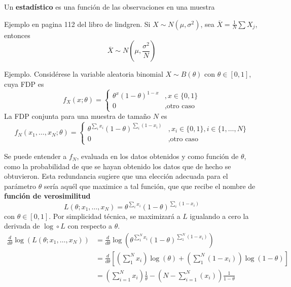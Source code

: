
\begin{definicion}
Un \textbf{estadístico} es una función de las observaciones en una muestra
\end{definicion}

Ejemplo en pagina 112 del libro de lindgren.
Si $X\sim N(\mu,\sigma^{2})$, sea $\overline{X} = \frac{1}{N} \sum X_j$, entonces
\begin{equation}
\overline{X} \sim N(\mu,\frac{\sigma^{2}}{N})
\end{equation}

Ejemplo.
Considérese la variable aleatoria binomial $X \sim B(\theta)$ con $\theta \in [0, 1]$, cuya FDP es
\begin{equation}
f_X(x; \theta) = \begin{cases}
\theta^{x} (1-\theta)^{1-x} &, x\in \{ 0,1 \} \\
0 &, \text{otro caso}
\end{cases}
\end{equation}
La FDP conjunta para una muestra de tamaño $N$ es
\begin{equation}
f_N(x_1, \dots, x_N; \theta) = 
\begin{cases}
\theta^{\sum_i x_i}(1-\theta)^{\sum_i(1-x_i)} &, x_i \in \{ 0,1 \}, i\in \{1, \dots, N\} \\
0 &, \text{otro caso}
\end{cases}
\end{equation}

Se puede entender a $f_N$, evaluada en los datos obtenidos y como función de $\theta$, como la probabilidad de que se hayan obtenido los datos que de hecho se obtuvieron.
%
Esta redundancia sugiere que una elección adecuada para el parámetro $\theta$ sería aquél que maximice a tal función, que que recibe el nombre de \textbf{función de verosimilitud}
\begin{equation}
L(\theta; x_1, \dots, x_N) = \theta^{\sum_i x_i}(1-\theta)^{\sum_i(1-x_i)}
\end{equation}
con $\theta \in [0, 1]$. Por simplicidad técnica, se maximizará a $L$ igualando a cero la derivada de $\log \circ L$ con respecto a $\theta$.
\begin{align*}
\frac{d}{d\theta} \log\left( L(\theta; x_1, \dots, x_N)\right)
&= 
\frac{d}{d\theta} \log\left(\theta^{\sum_1^{N} x_i}(1-\theta)^{\sum_1^{N}(1-x_i)}\right) \\
&=
\frac{d}{d\theta} \left[ \left( \sum_{1}^{N} x_i \right) \log(\theta) + 
\left( \sum_{1}^{N}(1-x_i) \right) \log (1-\theta)\right] \\
&= \left( \sum_{i=1}^{N} x_i \right) \frac{1}{\theta} -
\left( N - \sum_{i=1}^{N}(x_i) \right) \frac{1}{1-\theta}
\end{align*}

